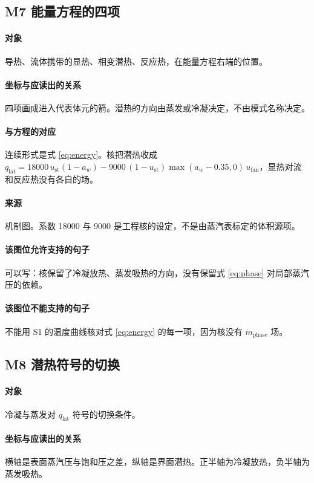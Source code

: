 \subsection{M7 能量方程的四项}
\paragraph{对象}
导热、流体携带的显热、相变潜热、反应热，在能量方程右端的位置。

\paragraph{坐标与应读出的关系}
四项画成进入代表体元的箭。潜热的方向由蒸发或冷凝决定，不由模式名称决定。

\paragraph{与方程的对应}
连续形式是式 \eqref{eq:energy}。核把潜热收成 $q_{\mathrm{lat}}=18000\,u_{\mathrm{st}}(1-a_w)-9000\,(1-u_{\mathrm{st}})\max(a_w-0.35,0)\,u_{\mathrm{fan}}$，显热对流和反应热没有各自的场。

\paragraph{来源}
机制图。系数 18000 与 9000 是工程核的设定，不是由蒸汽表标定的体积源项。

\paragraph{该图位允许支持的句子}
可以写：核保留了冷凝放热、蒸发吸热的方向，没有保留式 \eqref{eq:phase} 对局部蒸汽压的依赖。

\paragraph{该图位不能支持的句子}
不能用 S1 的温度曲线核对式 \eqref{eq:energy} 的每一项，因为核没有 $\dot m_{\mathrm{phase}}$ 场。

\subsection{M8 潜热符号的切换}
\paragraph{对象}
冷凝与蒸发对 $q_{\mathrm{lat}}$ 符号的切换条件。

\paragraph{坐标与应读出的关系}
横轴是表面蒸汽压与饱和压之差，纵轴是界面潜热。正半轴为冷凝放热，负半轴为蒸发吸热。

